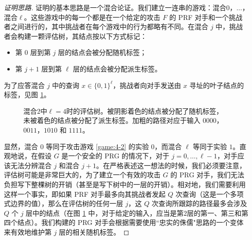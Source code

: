 \begin{proof}[证明思路]
证明的基本思路是一个混合论证。我们建立一连串的游戏：混合$0$，$\dots$，混合$\ell$。这些游戏中的每一个都是在一个给定的攻击 $F$ 的 PRF 对手和一个挑战者之间进行的，其中挑战者在每个游戏中的行为都略有不同。在混合 $j$ 中，挑战者会构建一颗评估树，其结点按以下方式标记：
\begin{itemize}
	\item 第 $0$ 层到第 $j$ 层的结点会被分配随机标签；
	\item 第 $j+1$ 层到第 $\ell$ 层的结点会被分配派生标签。
\end{itemize}
为了应答混合 $j$ 中的查询 $x\in\{0,1\}^\ell$，挑战者向对手发送由 $x$ 寻址的叶子结点的标签，见图 \ref{fig:4-16}。

\begin{figure}
  \centering
  
  \caption{混合$2$中$\ell=4$时的评估树。被阴影着色的结点被分配了随机标签，未被着色的结点被分配了派生标签。加粗的路径对应于输入 $0000$，$0011$，$1010$ 和 $1111$。}
  \label{fig:4-16}
\end{figure}

显然，混合 $0$ 等同于攻击游戏 \ref{game:4-2} 的实验 $0$，而混合 $\ell$ 等同于实验 $1$。直观地说，在假设 $G$ 是一个安全的 PRG 的情况下，对于 $j=0,\dots,\ell-1$，对手应该无法分辨混合 $j$ 和混合 $j+1$。在严格表述这一想法的时候，我们必须要注意，评估树可能是非常巨大的，为了建立一个有效的攻击 $G$ 的 PRG 对手，我们无法负担写下整棵树的开销（甚至是写下树中的一层的开销）。相对地，我们需要利用这样一个事实，即如果 PRF 对手最多向其挑战者发起 $Q$ 次查询（这是一个多项式边界的值），那么在评估树的任何一层 $j$，这 $Q$ 次查询所跟踪的路径最多会涉及 $Q$ 个 $j$ 层中的结点（在图 \ref{fig:4-16} 中，对于给定的输入，应当是第$2$层的第一、第三和第四个结点）。我们构建的 PRG 对手会根据需要使用``忠实的侏儒"思路的一个变体来有效地维护第 $j$ 层的相关随机标签。
\end{proof}

